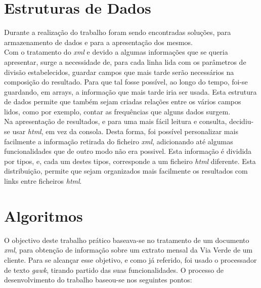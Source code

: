 \documentclass{report}
\begin{document}
\section{Estruturas de Dados}
	Durante a realização do trabalho foram sendo encontradas soluções, para armazenamento de dados e para a apresentação dos mesmos. \\
	Com o tratamento do \textit{xml} e devido a algumas informações que se queria apresentar, surge a necessidade de, para cada linha lida com os parâmetros de divisão estabelecidos, guardar campos que mais tarde serão necessários na composição do resultado. Para que tal fosse possível, ao longo do tempo, foi-se guardando, em arrays, a informação que mais tarde iria ser usada. Esta estrutura de dados permite que também sejam criadas relações entre os vários campos lidos, como por exemplo, contar as frequências que alguns dados surgem.\\
	Na apresentação de resultados, e para uma mais fácil leitura e consulta, decidiu-se usar \textit{html}, em vez da consola. Desta forma, foi possível personalizar mais facilmente a informação retirada do ficheiro \textit{xml}, adicionando até algumas funcionalidades que de outro modo não era possivel. Esta informação é dividida por tipos, e, cada um destes tipos, corresponde a um ficheiro \textit{html} diferente. Esta distribuição, permite que sejam organizados mais facilmente os resultados com links entre ficheiros \textit{html}. 
	
\section{Algoritmos}
	O objectivo deste trabalho prático baseava-se no tratamento de um documento \textit{xml}, para obtenção de informação sobre um extrato mensal da Via Verde de um cliente. 
Para se alcançar esse objetivo, e como já referido, foi usado o processador de texto \textit{gawk},  tirando partido das suas funcionalidades. 
	O processo de desenvolvimento do trabalho baseou-se nos seguintes pontos: \\
\end{document}
